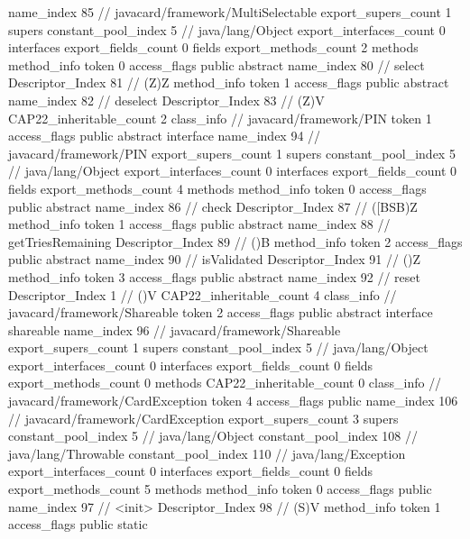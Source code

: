 {{{			name_index	85		// javacard/framework/MultiSelectable
			export_supers_count	1
			supers {
				constant_pool_index	5		// java/lang/Object
			}
			export_interfaces_count	0
			interfaces {
			}
			export_fields_count	0
			fields {
			}
			export_methods_count	2
			methods {
				method_info {
					token	0
					access_flags	public abstract
					name_index	80		// select
					Descriptor_Index	81		// (Z)Z
				}
				method_info {
					token	1
					access_flags	public abstract
					name_index	82		// deselect
					Descriptor_Index	83		// (Z)V
				}
			}
			CAP22_inheritable_count	2
		}
		class_info {		// javacard/framework/PIN
			token	1
			access_flags	public abstract interface
			name_index	94		// javacard/framework/PIN
			export_supers_count	1
			supers {
				constant_pool_index	5		// java/lang/Object
			}
			export_interfaces_count	0
			interfaces {
			}
			export_fields_count	0
			fields {
			}
			export_methods_count	4
			methods {
				method_info {
					token	0
					access_flags	public abstract
					name_index	86		// check
					Descriptor_Index	87		// ([BSB)Z
				}
				method_info {
					token	1
					access_flags	public abstract
					name_index	88		// getTriesRemaining
					Descriptor_Index	89		// ()B
				}
				method_info {
					token	2
					access_flags	public abstract
					name_index	90		// isValidated
					Descriptor_Index	91		// ()Z
				}
				method_info {
					token	3
					access_flags	public abstract
					name_index	92		// reset
					Descriptor_Index	1		// ()V
				}
			}
			CAP22_inheritable_count	4
		}
		class_info {		// javacard/framework/Shareable
			token	2
			access_flags	public abstract interface shareable
			name_index	96		// javacard/framework/Shareable
			export_supers_count	1
			supers {
				constant_pool_index	5		// java/lang/Object
			}
			export_interfaces_count	0
			interfaces {
			}
			export_fields_count	0
			fields {
			}
			export_methods_count	0
			methods {
			}
			CAP22_inheritable_count	0
		}
		class_info {		// javacard/framework/CardException
			token	4
			access_flags	public
			name_index	106		// javacard/framework/CardException
			export_supers_count	3
			supers {
				constant_pool_index	5		// java/lang/Object
				constant_pool_index	108		// java/lang/Throwable
				constant_pool_index	110		// java/lang/Exception
			}
			export_interfaces_count	0
			interfaces {
			}
			export_fields_count	0
			fields {
			}
			export_methods_count	5
			methods {
				method_info {
					token	0
					access_flags	public
					name_index	97		// <init>
					Descriptor_Index	98		// (S)V
				}
				method_info {
					token	1
					access_flags	public static
}}}}}
